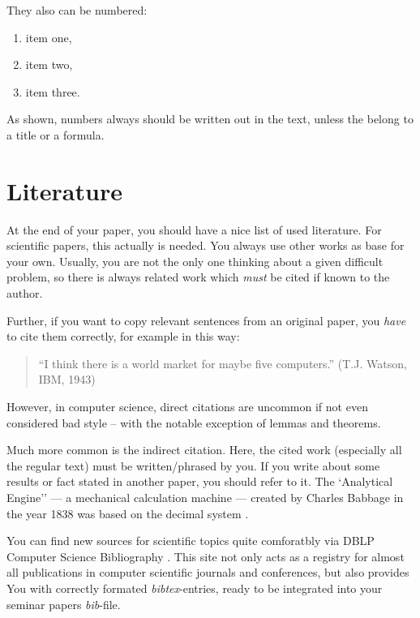 \documentclass[twocolumn]{article}
\begin{document}
They also can be numbered:

\begin{enumerate}
	\item item one,
	\item item two,
	\item item three.
\end{enumerate}

As shown, numbers always should be written out in the text, unless the
belong to a title or a formula.

\section{Literature}

At the end of your paper, you should have a nice list of used
literature. For scientific papers, this actually is needed. You always
use other works as base for your own. Usually, you are not the only
one thinking about a given difficult problem, so there is always
related work which {\em must} be cited if known to the author.

Further, if you want to copy relevant sentences from an
original paper, you {\em have} to cite them correctly, for example
in this way:
\begin{quote}
	``I think there is a world market for maybe five computers.''
	(T.J. Watson, IBM, 1943)
\end{quote}
However, in computer science, direct citations are uncommon if not
even considered bad style -- with the notable exception of lemmas
and theorems.

Much more common is the indirect citation. Here, the cited work
(especially all the regular text) must be
written/phrased by you. If you write about some results or fact
stated in another paper, you should refer to it.
The `Analytical Engine'' --- a mechanical calculation machine ---
created by Charles Babbage in the year 1838 was based on the decimal
system
\cite{Brom98}.

You can find new sources for scientific topics quite comforatbly via
DBLP Computer Science Bibliography \cite{DBLP}. This site not only
acts as a registry for almost all publications in computer scientific
journals and conferences, but also provides You with correctly
formated \emph{bibtex}-entries, ready to be integrated into your
seminar papers \emph{bib}-file.
\end{document}

